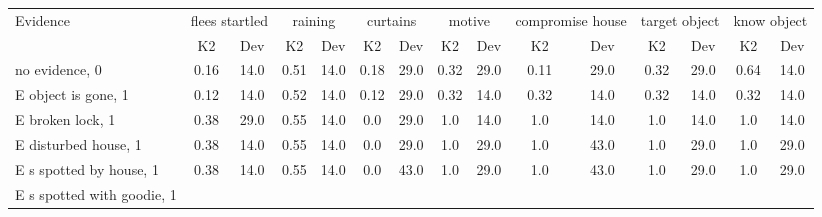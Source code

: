 \begin{table}\begin{tabular}{l|cc|cc|cc|cc|cc|cc|cc}\toprule\multirow{2}{*}{Evidence} & \multicolumn{2}{c}{flees startled}& \multicolumn{2}{c}{raining}& \multicolumn{2}{c}{curtains}& \multicolumn{2}{c}{motive}& \multicolumn{2}{c}{compromise house}& \multicolumn{2}{c}{target object}& \multicolumn{2}{c}{know object}\\& {K2} & {Dev}& {K2} & {Dev}& {K2} & {Dev}& {K2} & {Dev}& {K2} & {Dev}& {K2} & {Dev}& {K2} & {Dev}\\\midrule
no evidence, 0 & \cellcolor{Bittersweet}0.16&\cellcolor{Bittersweet}14.0&\cellcolor{Bittersweet}0.51&\cellcolor{Bittersweet}14.0&\cellcolor{Bittersweet}0.18&\cellcolor{Bittersweet}29.0&\cellcolor{Bittersweet}0.32&\cellcolor{Bittersweet}29.0&\cellcolor{Bittersweet}0.11&\cellcolor{Bittersweet}29.0&\cellcolor{Bittersweet}0.32&\cellcolor{Bittersweet}29.0&\cellcolor{Bittersweet}0.64&\cellcolor{Bittersweet}14.0\\E object is gone, 1 & \cellcolor{Bittersweet}0.12&\cellcolor{Bittersweet}14.0&\cellcolor{Bittersweet}0.52&\cellcolor{Bittersweet}14.0&\cellcolor{Bittersweet}0.12&\cellcolor{Bittersweet}29.0&\cellcolor{Bittersweet}0.32&\cellcolor{Bittersweet}14.0&\cellcolor{Bittersweet}0.32&\cellcolor{Bittersweet}14.0&\cellcolor{Bittersweet}0.32&\cellcolor{Bittersweet}14.0&\cellcolor{Bittersweet}0.32&\cellcolor{Bittersweet}14.0\\E broken lock, 1 & \cellcolor{Bittersweet}0.38&\cellcolor{Bittersweet}29.0&\cellcolor{Bittersweet}0.55&\cellcolor{Bittersweet}14.0&\cellcolor{Bittersweet}0.0&\cellcolor{Bittersweet}29.0&\cellcolor{Bittersweet}1.0&\cellcolor{Bittersweet}14.0&\cellcolor{Bittersweet}1.0&\cellcolor{Bittersweet}14.0&\cellcolor{Bittersweet}1.0&\cellcolor{Bittersweet}14.0&\cellcolor{Bittersweet}1.0&\cellcolor{Bittersweet}14.0\\E disturbed house, 1 & \cellcolor{Bittersweet}0.38&\cellcolor{Bittersweet}14.0&\cellcolor{Bittersweet}0.55&\cellcolor{Bittersweet}14.0&\cellcolor{Bittersweet}0.0&\cellcolor{Bittersweet}29.0&\cellcolor{Bittersweet}1.0&\cellcolor{Bittersweet}29.0&\cellcolor{Bittersweet}1.0&\cellcolor{Bittersweet}43.0&\cellcolor{Bittersweet}1.0&\cellcolor{Bittersweet}29.0&\cellcolor{Bittersweet}1.0&\cellcolor{Bittersweet}29.0\\E s spotted by house, 1 & \cellcolor{Bittersweet}0.38&\cellcolor{Bittersweet}14.0&\cellcolor{Bittersweet}0.55&\cellcolor{Bittersweet}14.0&\cellcolor{Bittersweet}0.0&\cellcolor{Bittersweet}43.0&\cellcolor{Bittersweet}1.0&\cellcolor{Bittersweet}29.0&\cellcolor{Bittersweet}1.0&\cellcolor{Bittersweet}43.0&\cellcolor{Bittersweet}1.0&\cellcolor{Bittersweet}29.0&\cellcolor{Bittersweet}1.0&\cellcolor{Bittersweet}29.0\\E s spotted with goodie, 1 & 
\end{tabular}
\end{table}
